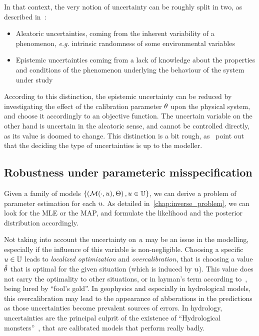 \documentclass[../../Main_ManuscritThese.tex]{subfiles}
\begin{document}
In that context, the very notion of uncertainty can be roughly split in two, as described in~\cite{walker_defining_2003}:
\begin{itemize}
\item Aleatoric uncertainties, coming from the inherent variability of a phenomenon, \emph{e.g.} intrinsic randomness of some environmental variables
\item Epistemic uncertainties coming from a lack of knowledge about the properties and conditions of the phenomenon underlying the behaviour of the system under study
\end{itemize}
According to this distinction,  the epistemic uncertainty can be reduced by investigating the effect of the calibration parameter $\theta$ upon the physical system, and choose it accordingly to an objective function.
The uncertain variable on the other hand is uncertain in the aleatoric sense, and cannot be controlled directly, as its value is doomed to change. This distinction is a bit rough, as~\cite{kiureghian_aleatory_2009} point out that the deciding the type of uncertainties is up to the modeller.



\subsection{Robustness under parameteric misspecification}

Given a family of models $\left\{\left(\mathcal{M}(\cdot, u), \Theta\right), u\in\mathbb{U}\right\}$, we can derive a problem of parameter estimation for each $u$. As detailed in~\cref{chap:inverse_problem}, we can look for the MLE or the MAP, and formulate the likelihood and the posterior distribution accordingly.



Not taking into account the uncertainty on $u$ may be an issue in the modelling, especially if the influence of this variable is non-negligible.
Choosing a specific $u \in \mathbb{U}$ leads to \emph{localized optimization} \citep{huyse_free-form_2001} and \emph{overcalibration}, that is choosing a value $\hat{\theta}$ that is optimal for the given situation (which is induced by $u$). This value does not carry the optimality to other situations, or in layman's term according to~\cite{andreassian_all_2012}, being lured by ``fool's gold''.
In geophysics and especially in hydrological models, this overcalibration may lead to the appearance of abberations in the predictions as those uncertainties become prevalent sources of errors. In hydrology, uncertainties are the principal culprit of the existence of  ``Hydrological monsters''~\citep{kuczera_there_2010}, that are calibrated models that perform really badly.
\end{document}

